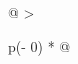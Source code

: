 \documentclass[
]{article}
\begin{document}
\begin{longtable}[]{@{}
  >{\raggedright\arraybackslash}p{(\columnwidth - 0\tabcolsep) * }@{}}
\toprule\noalign{}
\begin{minipage}[b]{\linewidth}\raggedright
\end{minipage} \\
\midrule\noalign{}
\endhead
\bottomrule\noalign{}
\endlastfoot
 \\
 \\
 \\
 \\
 \\
 \\
 \\
 \\
 \\
 \\
 \\
 \\
 \\
 \\
 \\
 \\
 \\
 \\
 \\
 \\
 \\
 \\
 \\
 \\
 \\
 \\
 \\
 \\
 \\
 \\
 \\
 \\
 \\
 \\
 \\
 \\
 \\
 \\
 \\
 \\
 \\
 \\
 \\
 \\
 \\
 \\
 \\
 \\
 \\
 \\
 \\
 \\
 \\
 \\
\end{longtable}
\end{document}
